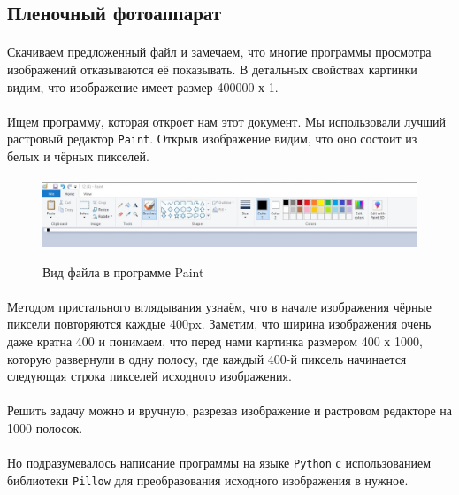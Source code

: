 \documentclass[12pt]{article}
\begin{document}
    \subsection{Пленочный фотоаппарат}
    \paragraph{}
    Скачиваем предложенный файл и замечаем, что многие программы просмотра изображений
    отказываются её показывать. В детальных свойствах картинки видим,
    что изображение имеет размер 400000 х 1.
    \paragraph{}
    Ищем программу, которая откроет нам этот документ. Мы использовали лучший растровый редактор \verb|Paint|.
    Открыв изображение видим, что оно состоит из белых и чёрных пикселей.
    \paragraph{}
    \begin{figure}[H]
        \centering
        \includegraphics[width=\linewidth]{task12}
        \label{fig:task12}
        \caption{Вид файла в программе Paint}
    \end{figure}
    \paragraph{}
    Методом пристального вглядывания узнаём, что в начале изображения чёрные пиксели повторяются каждые 400px.
    Заметим, что ширина изображения очень даже кратна 400 и понимаем, что перед нами картинка размером 400 х 1000,
    которую развернули в одну полосу, где каждый 400-й пиксель начинается следующая строка пикселей исходного изображения.
    \paragraph{}
    Решить задачу можно и вручную, разрезав изображение и растровом редакторе на 1000 полосок.
    \paragraph{}
    Но подразумевалось написание программы на языке \verb|Python| с использованием библиотеки \verb|Pillow|
    для преобразования исходного изображения в нужное.
\end{document}
